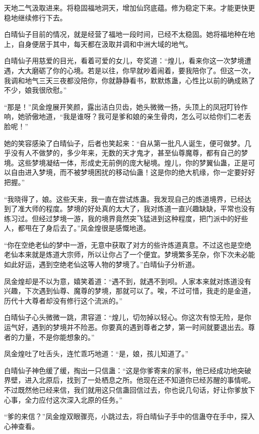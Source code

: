 \begin{this_body}
天地二气汲取进来。将稳固福地洞天，增加仙窍底蕴。修为稳定下来。才能更快更稳地继续修行下去。

白晴仙子目前的情况，就是经营了福地一段时间，已经不太稳固。她将福地种在地上，自身便居于其中，每天都在汲取并调和中洲大域的地气。

白晴仙子用慈爱的目光，看着可爱的女儿，夸奖道：“煌儿，看来你这一次梦境遭遇，大大磨砺了你的心境。若是以往，你早就吵着闹着，要我陪你了。但这一次，我调和地气三天三夜都没陪你，你就静静看书，默默炼蛊，心性比以前的确成熟了不少，娘我很欣慰。”

“那是！”凤金煌展开笑颜，露出洁白贝齿，她头微微一扬，头顶上的凤冠叮铃作响，她骄傲地道，“我是谁呀？我可是爹和娘的亲生骨肉，怎么可以给你们二老丢脸呢！”

她的笑容感染了白晴仙子，后者也笑起来：“自从第一批凡人诞生，便可做梦。几乎没有人不做梦的，多少年来，无数的天才鬼才，甚至仙尊魔尊，都有自己的梦境。这些梦境凝结一体，形成史无前例的庞大秘境。煌儿，你的梦翼仙蛊，正是可以自由进入梦境，而不被梦境困扰的移动仙蛊！这是你的绝大机缘，你一定要好好把握。”

“我晓得了，娘。这些天来，我一直在尝试炼蛊。我发现自己的炼道境界，已经达到了准大师的程度。梦境的好处真的太大了，我对炼道一直兴趣缺缺，平常也没有练习过。但经过梦境一游，我的境界竟然突飞猛进到这种程度，把门派中的好些人，都甩在了身后去了。”凤金煌很是感慨地道。

“你在空绝老仙的梦中一游，无意中获取了对方的些许炼道真意。不过这也是空绝老仙本来就是炼道大宗师，所以让你占了一个便宜。梦境繁多芜杂，你下次未必能如此好运，遇到空绝老仙这等人物的梦境了。”白晴仙子分析道。

凤金煌却是不以为意，嬉笑着道：“遇不到，就遇不到呗。人家本来就对炼道没有兴趣，下次遇到仙尊、魔尊的梦境，那就可以了。唉，不过可惜，我走的是金道，历代十大尊者却没有修行这个流派的。”

白晴仙子心头微微一跳，肃容道：“煌儿，切勿掉以轻心。你这次有惊无险，是你运气好，遇到的梦境并不险恶。你要真的遇到尊者之梦，第一时间就要退出去。尊者的力量，不是你能想象的。”

凤金煌吐了吐舌头，连忙乖巧地道：“是，娘，孩儿知道了。”

白晴仙子神色缓了缓，掏出一只信蛊：“这是你爹寄来的家书，他已经成功地突破界壁，进入北原后，找到了一处栖息之所。他现在还不知道你已经苏醒的事情呢。不过既然他已经来信，我们就用这只信蛊回信过去，你也说几句话，好让你爹放下心事，全力应付这次深入北原的任务。”

“爹的来信？”凤金煌双眼骤亮，小跳过去，将白晴仙子手中的信蛊夺在手中，探入心神查看。


\end{this_body}
